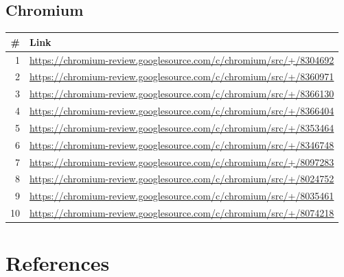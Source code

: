 \documentclass[11pt]{article}
\begin{document}
\subsection*{Chromium}

\begin{longtable}{@{}rl@{}}
\toprule
\textbf{\#} & \textbf{Link} \\
\midrule
\endhead
1  & \url{https://chromium-review.googlesource.com/c/chromium/src/+/8304692} \\
2  & \url{https://chromium-review.googlesource.com/c/chromium/src/+/8360971} \\
3  & \url{https://chromium-review.googlesource.com/c/chromium/src/+/8366130} \\
4  & \url{https://chromium-review.googlesource.com/c/chromium/src/+/8366404} \\
5  & \url{https://chromium-review.googlesource.com/c/chromium/src/+/8353464} \\
6  & \url{https://chromium-review.googlesource.com/c/chromium/src/+/8346748} \\
7  & \url{https://chromium-review.googlesource.com/c/chromium/src/+/8097283} \\
8  & \url{https://chromium-review.googlesource.com/c/chromium/src/+/8024752} \\
9  & \url{https://chromium-review.googlesource.com/c/chromium/src/+/8035461} \\
10 & \url{https://chromium-review.googlesource.com/c/chromium/src/+/8074218} \\
\bottomrule
\end{longtable}

\section{References}
\label{app:references}
\end{document}
